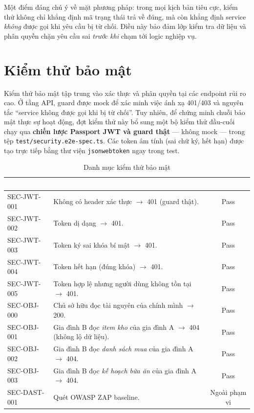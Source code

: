 \documentclass[12pt,a4paper]{article}
\newcommand{\code}[1]{\texttt{#1}}
\newcommand{\thead}[1]{\textbf{\textcolor{white}{#1}}}
\begin{document}
Một điểm đáng chú ý về mặt phương pháp: trong mọi kịch bản tiêu cực, kiểm thử không chỉ khẳng định mã trạng
thái trả về đúng, mà còn khẳng định service \emph{không} được gọi khi yêu cầu bị từ chối. Điều này bảo đảm
lớp kiểm tra dữ liệu và phân quyền chặn yêu cầu sai \emph{trước khi} chạm tới logic nghiệp vụ.

\section{Kiểm thử bảo mật}

Kiểm thử bảo mật tập trung vào xác thực và phân quyền tại các endpoint rủi ro cao. Ở tầng API, guard được
mock để xác minh việc ánh xạ 401/403 và nguyên tắc ``service không được gọi khi bị từ chối''. Tuy nhiên, để
chứng minh chuỗi bảo mật thực sự hoạt động, đợt kiểm thử này bổ sung một bộ kiểm thử đầu-cuối chạy qua
\textbf{chiến lược Passport JWT và guard thật} --- không mock --- trong tệp \code{test/security.e2e-spec.ts}.
Các token âm tính (sai chữ ký, hết hạn) được tạo trực tiếp bằng thư viện \code{jsonwebtoken} ngay trong test.

\begin{table}[h]
\centering
\caption{Danh mục kiểm thử bảo mật}
\label{tab:sec}
\begin{tabularx}{\linewidth}{|l|Y|c|}
\hline
{}
\thead{Mã} & \thead{Mục tiêu} & \thead{Trạng thái} \\
\hline
SEC-JWT-001 & Không có header xác thực $\to$ 401 (guard thật). & Pass \\
\hline
SEC-JWT-002 & Token dị dạng $\to$ 401. & Pass \\
\hline
SEC-JWT-003 & Token ký sai khóa bí mật $\to$ 401. & Pass \\
\hline
SEC-JWT-004 & Token hết hạn (đúng khóa) $\to$ 401. & Pass \\
\hline
SEC-JWT-005 & Token hợp lệ nhưng người dùng không tồn tại $\to$ 401. & Pass \\
\hline
SEC-OBJ-000 & Chủ sở hữu đọc tài nguyên của chính mình $\to$ 200. & Pass \\
\hline
SEC-OBJ-001 & Gia đình B đọc \emph{item kho} của gia đình A $\to$ 404 (không lộ dữ liệu). & Pass \\
\hline
SEC-OBJ-002 & Gia đình B đọc \emph{danh sách mua} của gia đình A $\to$ 404. & Pass \\
\hline
SEC-OBJ-003 & Gia đình B đọc \emph{kế hoạch bữa ăn} của gia đình A $\to$ 404. & Pass \\
\hline
SEC-DAST-001 & Quét OWASP ZAP baseline. & Ngoài phạm vi \\
\hline
\end{tabularx}
\end{table}
\end{document}
